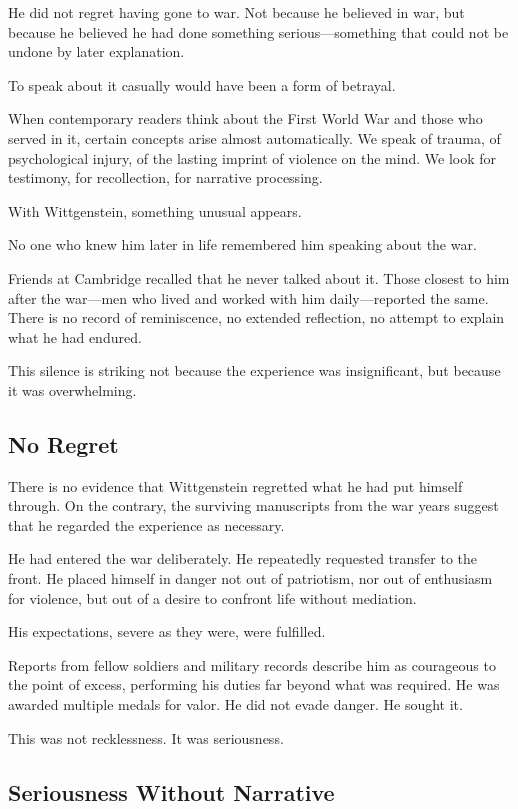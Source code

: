 \documentclass[11pt]{article}
\begin{document}
He did not regret having gone to war. Not because he believed in war, but because he believed he had done something serious—something that could not be undone by later explanation.

To speak about it casually would have been a form of betrayal.

When contemporary readers think about the First World War and those who served in it, certain concepts arise almost automatically. We speak of trauma, of psychological injury, of the lasting imprint of violence on the mind. We look for testimony, for recollection, for narrative processing.

With Wittgenstein, something unusual appears.

No one who knew him later in life remembered him speaking about the war.

Friends at Cambridge recalled that he never talked about it. Those closest to him after the war—men who lived and worked with him daily—reported the same. There is no record of reminiscence, no extended reflection, no attempt to explain what he had endured.

This silence is striking not because the experience was insignificant, but because it was overwhelming.

\subsection*{No Regret}

There is no evidence that Wittgenstein regretted what he had put himself through. On the contrary, the surviving manuscripts from the war years suggest that he regarded the experience as necessary.

He had entered the war deliberately. He repeatedly requested transfer to the front. He placed himself in danger not out of patriotism, nor out of enthusiasm for violence, but out of a desire to confront life without mediation.

His expectations, severe as they were, were fulfilled.

Reports from fellow soldiers and military records describe him as courageous to the point of excess, performing his duties far beyond what was required. He was awarded multiple medals for valor. He did not evade danger. He sought it.

This was not recklessness. It was seriousness.

\subsection*{Seriousness Without Narrative}
\end{document}
